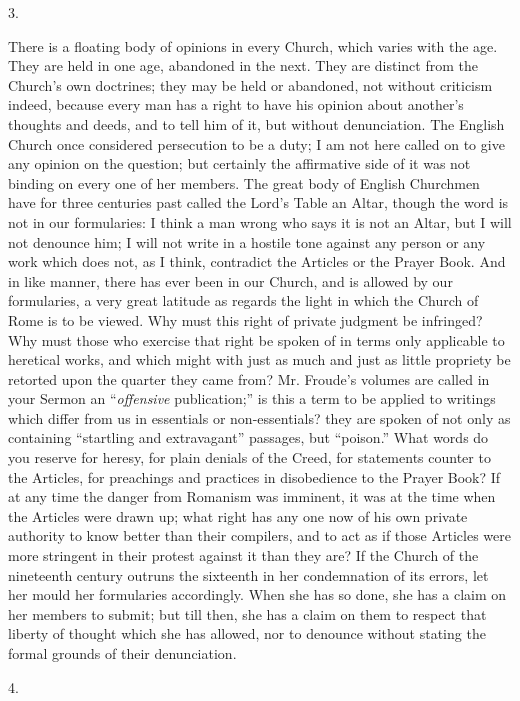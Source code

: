 3.

There is a floating body of opinions in every
Church, which varies with the age. They are held in one age,
abandoned in the next. They are distinct from the Church's own
doctrines; they may be held or abandoned, not without criticism
indeed, because every man has a right to have his opinion about
another's thoughts and deeds, and to tell him of it, but without
denunciation. The English Church once considered persecution to be a
duty; I am not here called on to give any opinion on the question; but
certainly the affirmative side of it was not binding on every one of
her members. The great body of English Churchmen have for three
centuries past called the Lord's Table an Altar, though the word is
not in our formularies: I think a man wrong who says it is not an
Altar, but I will not denounce him; I will not write in a hostile tone
against any person or any work which does not, as I think, contradict
the Articles or the Prayer Book. And in like manner, there has ever
been in our Church, and is allowed by our formularies, a very great
latitude as regards the light in which the Church of Rome is to be
viewed. Why must this right of private judgment be infringed? Why must
those who exercise that right be spoken of in terms only applicable to
heretical works, and which might with just as much and just as little
propriety be retorted upon the quarter they came from? Mr. Froude's
volumes are called in your Sermon an ``\emph{offensive}
publication;'' is this a term to be applied to writings which differ
from us in essentials or non-essentials? they are spoken of not only
as containing ``startling and extravagant'' passages, but ``poison.'' What words do you reserve for heresy, for plain denials
of the Creed, for statements counter to the Articles, for preachings
and practices in disobedience to the Prayer Book? If at any time the
danger from Romanism was imminent, it was at the time when the
Articles were drawn up; what right has any one now of his own private
authority to know better than their compilers, and to act as if
those Articles were more stringent in their protest against it than
they are? If the Church of the nineteenth century outruns the
sixteenth in her condemnation of its errors, let her mould her
formularies accordingly. When she has so done, she has a claim on her
members to submit; but till then, she has a claim on them to respect
that liberty of thought which she has allowed, nor to denounce without
stating the formal grounds of their denunciation.

4.


